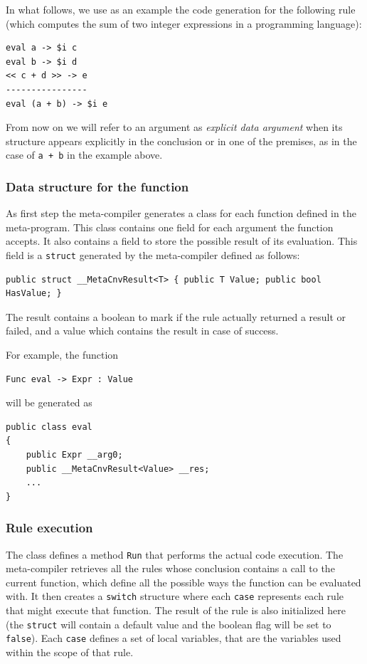 \noindent
In what follows, we use as an example the code generation for the following rule (which computes the sum of two integer expressions in a programming language):

\begin{lstlisting}
eval a -> $i c
eval b -> $i d
<< c + d >> -> e
----------------
eval (a + b) -> $i e
\end{lstlisting}

From now on we will refer to an argument as \textit{explicit data argument} when its structure appears explicitly in the conclusion or in one of the premises, as in the case of \texttt{a + b} in the example above.

\subsubsection{Data structure for the function}
\label{subsubsec:function_generation}

As first step the meta-compiler generates a class for each function defined in the meta-program. This class contains one field for each argument the function accepts. It also contains a field to store the possible result of its evaluation. This field is a \texttt{struct} generated by the meta-compiler defined as follows:

\begin{lstlisting}
public struct __MetaCnvResult<T> { public T Value; public bool HasValue; }
\end{lstlisting}

The result contains a boolean to mark if the rule actually returned a result or failed, and a value which contains the result in case of success.

For example, the function

\begin{lstlisting}
Func eval -> Expr : Value
\end{lstlisting}

\noindent
will be generated as

\begin{lstlisting}
public class eval
{
	public Expr __arg0;
	public __MetaCnvResult<Value> __res;
	...
}
\end{lstlisting}

\subsubsection{Rule execution}

The class defines a method \texttt{Run} that performs the actual code execution. The meta-compiler retrieves all the rules whose conclusion contains a call to the current function, which define all the possible ways the function can be evaluated with. It then creates a \texttt{switch} structure where each \texttt{case} represents each rule that might execute that function. The result of the rule is also initialized here (the \texttt{struct} will contain a default value and the boolean flag will be set to \texttt{false}). Each \texttt{case} defines a set of local variables, that are the variables used within the scope of that rule.

